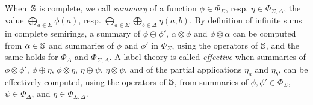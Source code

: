 %

\medskip\noindent
When~$\mathbb{S}$ is complete, 
we call \emph{summary} of a function
$\phi \in \Phi_\Sigma$,
resp. $\eta \in \Phi_{\Sigma, \Delta}$,
the value $\bigoplus_{a \in \Sigma} \phi(a)$, 
resp. $\bigoplus_{a \in \Sigma} \bigoplus_{b \in \Delta} \eta(a, b)$.
By definition of infinite sums in complete semirings, 
a summary of $\phi \oplus \phi'$, $\alpha \otimes \phi$ and $\phi \otimes \alpha$
can be computed from $\alpha \in \mathbb{S}$ and summaries of $\phi$ and $\phi'$ in $\Phi_{\Sigma}$, using the operators of $\mathbb{S}$, 
and the same holds for $\Phi_{\Delta}$ and $\Phi_{\Sigma, \Delta}$. 
%
A label theory is called \emph{effective} when 
summaries of $\phi \otimes \phi'$, 
$\phi \oplus \eta$, $\phi \otimes \eta$, $\eta \oplus \psi$, $\eta \otimes \psi$, 
and of the partial applications $\eta_a$ and $\eta_b$, 
can be effectively computed, using the operators of $\mathbb{S}$, 
from summaries of 
$\phi, \phi' \in \Phi_{\Sigma}$, $\psi \in \Phi_{\Delta}$, 
and $\eta \in \Phi_{\Sigma, \Delta}$. 

